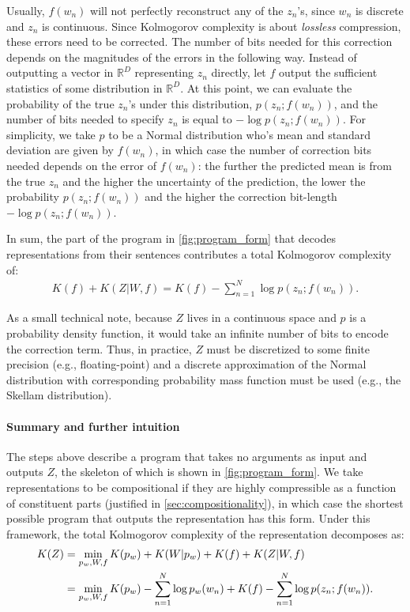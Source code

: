 \documentclass{article} %
\begin{document}
Usually, $f(w_n)$ will not perfectly reconstruct any of the $z_n$'s, since $w_n$ is discrete and $z_n$ is continuous. Since Kolmogorov complexity is about \emph{lossless} compression, these errors need to be corrected. The number of bits needed for this correction depends on the magnitudes of the errors in the following way. Instead of outputting a vector in $\mathbb{R}^D$ representing $z_n$ directly, let $f$ output the sufficient statistics of some distribution in $\mathbb{R}^D$. At this point, we can evaluate the probability of the true $z_n$'s under this distribution, $p(z_n;f(w_n))$, and the number of bits needed to specify $z_n$ is equal to $-\log p(z_n;f(w_n))$. For simplicity, we take $p$ to be a Normal distribution who's mean and standard deviation are given by $f(w_n)$, in which case the number of correction bits needed depends on the error of $f(w_n)$: the further the predicted mean is from the true $z_n$ and the higher the uncertainty of the prediction, the lower the probability $p(z_n;f(w_n))$ and the higher the correction bit-length $-\log p(z_n;f(w_n))$.

In sum, the part of the program in \cref{fig:program_form} that decodes representations from their sentences contributes a total Kolmogorov complexity of:
\begin{align*}
     K(f) + K(Z|W,f) = K(f) - \sum_{n=1}^N \log p(z_n;f(w_n)) .
\end{align*}

As a small technical note, because $Z$ lives in a continuous space and $p$ is a probability density function, it would take an infinite number of bits to encode the correction term. Thus, in practice, $Z$ must be discretized to some finite precision (e.g., floating-point) and a discrete approximation of the Normal distribution with corresponding probability mass function must be used (e.g., the Skellam distribution).

\paragraph{Summary and further intuition}

The steps above describe a program that takes no arguments as input and outputs $Z$, the skeleton of which is shown in \cref{fig:program_form}. We take representations to be compositional if they are highly compressible as a function of constituent parts (justified in \cref{sec:compositionality}), in which case the shortest possible program that outputs the representation has this form. Under this framework, the total Kolmogorov complexity of the representation decomposes as:
\begin{align}
    \label{eq:K(Z)}
    K(Z) &= \min_{p_w,W,f} K(p_w) + K(W|p_w) + K(f) + K(Z|W,f) \\
         &= \min_{p_w,W,f} K(p_w) - \sum_{n=1}^N \log p_w(w_n) + K(f) - \sum_{n=1}^N \log p(z_n;f(w_n)) . \notag
\end{align}
\end{document}
